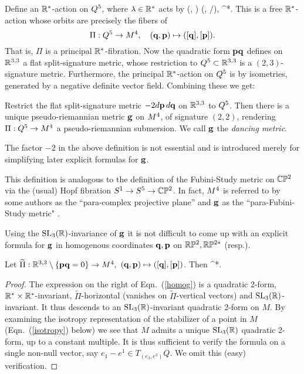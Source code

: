  Define  an $\mathbb{R}^*$-action on $Q^5$, where $\lambda\in \mathbb{R}^*$  acts   by 
 \be\label{Raction}
 (\q, \p)\mapsto
(\lambda\q, \p/\lambda), \quad \lambda\in\R^*.\ee 
This is a free $\mathbb{R}^*$-action whose  orbits are precisely the fibers of 
$$\Pi:Q^5\to M^4, \quad (\mathbf q, {\mathbf p})\mapsto([\mathbf q], [{\mathbf p}]).$$
That is, $\Pi$ is a principal $\mathbb{R}^*$-fibration.  Now the quadratic form ${\mathbf p}\mathbf q$ defines on  $\mathbb{R}^{3,3}$    a flat split-signature metric, whose restriction to $Q^5\subset \mathbb{R}^{3,3}$ is a  $(2,3)$-signature metric. Furthermore,   the principal $\mathbb{R}^*$-action on $Q^5$ is by isometries, generated by a  negative definite vector field. 
 Combining these we get:



\begin{proposition}\label{dancing}
Restrict the flat split-signature metric $-2d{\mathbf p} \, d\mathbf q$ on $\mathbb{R}^{3,3}$ to $Q^5$. Then there is a unique pseudo-riemannian metric $\mathbf{ g}$ on $M^4$, of signature $(2,2)$, rendering $\Pi:Q^5\to M^4$  a pseudo-riemannian  submersion. We call $\mathbf{ g}$  the {\em dancing metric}. 
 \end{proposition}
 
\begin{rmrk} The factor $-2$ in the above definition is not essential and is introduced merely for simplifying later explicit formulas for $\mathbf{ g}$. 
\end{rmrk}


\begin{rmrk} This definition  is analogous to the definition  of the Fubini-Study metric  on $\mathbb{C}\mathbb{P}^2$ via the (usual)  Hopf fibration $S^1\to S^5\to\mathbb{C}\mathbb{P}^2$. In fact, $M^4$ is referred to  by some authors as  the ``para-complex projective plane'' and  $\mathbf{ g}$ as the ``para-Fubini-Study metric"  \cite{A,CFG}. 
\end{rmrk}

Using the ${\mathrm{SL}_3(\mathbb{R})}$-invariance of $\mathbf{ g}$ it is not difficult to come up with an explicit formula for $\mathbf{ g}$ in homogenous coordinates  $\mathbf q, {\mathbf p}$ on $\mathbb{R}\mathbb{P}^2, \mathbb{R}\mathbb{P}^{2*}$ (resp.).
\begin{proposition}\label{homo}
Let $\widetilde \Pi:\mathbb{R}^{3,3}\setminus \{{\mathbf p}\mathbf q=0\}\to M^4, $ $(\mathbf q, {\mathbf p})\mapsto ([\mathbf q],[{\mathbf p}])$. Then 
\be\label{homog}
\widetilde \Pi^*.
\ee
\end{proposition}

\begin{proof} The expression on the right of Eqn.~(\ref{homog}) is a quadratic 2-form, $\mathbb{R}^*\times \mathbb{R}^*$-invariant, $\widetilde\Pi$-horizontal (vanishes on
 $\widetilde\Pi$-vertical vectors) and ${\mathrm{SL}_3(\mathbb{R})}$-invariant. It thus descends to an 
 ${\mathrm{SL}_3(\mathbb{R})}$-invariant quadratic 2-form on $M$. 
By examining the isotropy representation of the stabilizer of a point in 
 $M$ (Eqn.~(\ref{isotropy}) below) we see that $M$ admits a unique ${\mathrm{SL}_3(\mathbb{R})}$ quadratic 2-form, 
 up to a constant multiple. It is thus sufficient to verify  the formula  on a single non-null vector, 
 say $e_1-e^1\in T_{(e_3, e^3)}Q.$ We omit this (easy) verification. 
 \end{proof}
 
